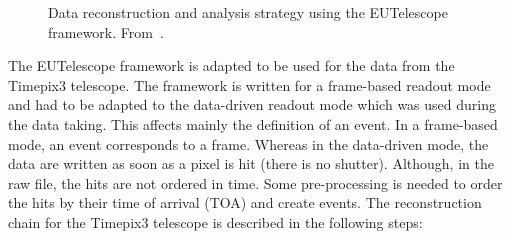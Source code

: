 \begin{figure}[htbp]
  \centering
  \caption{Data reconstruction and analysis strategy using the
    EUTelescope framework. From~\cite{Jansen:2016bkd}.}
  \label{fig:EUTelescope_EUDET_pipeline}
\end{figure}

The EUTelescope framework is adapted to be used for the data from the
Timepix3 telescope. The framework is written for a frame-based readout
mode and had to be adapted to the data-driven readout mode which was
used during the data taking. This affects mainly the definition of an
event. In a frame-based mode, an event corresponds to a frame. Whereas
in the data-driven mode, the data are written as soon as a pixel is
hit (there is no shutter). Although, in the raw file, the hits are not
ordered in time. Some pre-processing is needed to order the hits by
their time of arrival (TOA) and create events. The reconstruction
chain for the Timepix3 telescope is described in the following steps:


